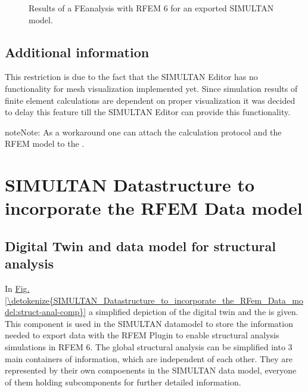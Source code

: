 \documentclass[letterpaper,10pt,english]{jupyterBook}
\let\sphinxpxdimen\pdfpxdimen\else\newdimen\sphinxpxdimen
\begin{document}
\begin{figure}[htbp]
\centering
\capstart

\noindent\sphinxincludegraphics[height=350\sphinxpxdimen]{{rfem_sim_results}.png}
\caption{Results of a FE\sphinxhyphen{}analysis with RFEM 6 for an exported SIMULTAN model.}\label{\detokenize{Results_of_the_simulation:rfem-sim-results}}\end{figure}


\section{Additional information}
\label{\detokenize{Results_of_the_simulation:additional-information}}
\sphinxAtStartPar
This restriction is due to the fact that the SIMULTAN Editor has no functionality for mesh visualization implemented
yet. Since simulation results of finite element calculations are dependent on proper visualization it was decided to
delay this feature till the SIMULTAN Editor can provide this functionality.

\begin{sphinxadmonition}{note}{Note:}
\sphinxAtStartPar
As a workaround one can attach the calculation protocol and the RFEM model to the .
\end{sphinxadmonition}

\sphinxstepscope


\chapter{SIMULTAN Datastructure to incorporate the RFEM Data model}
\label{\detokenize{SIMULTAN_Datastructure_to_incorporate_the_RFem_Data_model:simultan-datastructure-to-incorporate-the-rfem-data-model}}\label{\detokenize{SIMULTAN_Datastructure_to_incorporate_the_RFem_Data_model:id1}}\label{\detokenize{SIMULTAN_Datastructure_to_incorporate_the_RFem_Data_model::doc}}

\section{Digital Twin and data model for structural analysis}
\label{\detokenize{SIMULTAN_Datastructure_to_incorporate_the_RFem_Data_model:digital-twin-and-data-model-for-structural-analysis}}
\sphinxAtStartPar
In \hyperref[\detokenize{SIMULTAN_Datastructure_to_incorporate_the_RFem_Data_model:struct-anal-comp}]{Fig.\@ \ref{\detokenize{SIMULTAN_Datastructure_to_incorporate_the_RFem_Data_model:struct-anal-comp}}} a simplified depiction of the digital twin and the  is
given. This component is used in the SIMULTAN datamodel to store the information needed to export data with the RFEM
Plugin to enable structural analysis simulations in RFEM 6. The global structural analysis can be simplified into 3 main
containers of information, which are independent of each other. They are represented by their own compoenents in the
SIMULTAN data model, everyone of them holding sub\sphinxhyphen{}components for further detailed information.
\end{document}
